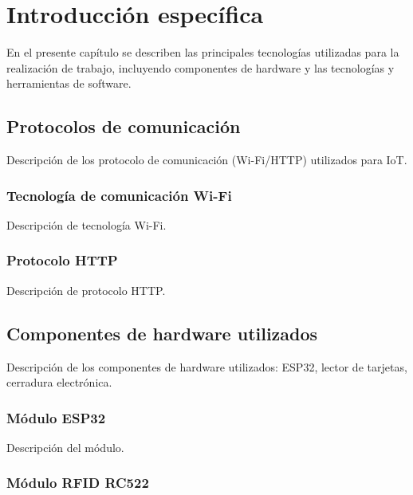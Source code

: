 \chapter{Introducción específica} %

\label{Chapter2}


En el presente capítulo se describen las principales tecnologías utilizadas para la realización de trabajo, incluyendo componentes de hardware y las tecnologías y herramientas de software.

\section{Protocolos de comunicación}

Descripción de los protocolo de comunicación (Wi-Fi/HTTP) utilizados para IoT.

\subsection{Tecnología de comunicación Wi-Fi}

Descripción de tecnología Wi-Fi.

\subsection{Protocolo HTTP}

Descripción de protocolo HTTP.

\section{Componentes de hardware utilizados}

Descripción de los componentes de hardware utilizados: ESP32, lector de tarjetas, cerradura electrónica.

\subsection{Módulo ESP32}

Descripción del módulo.

\subsection{Módulo RFID RC522}

